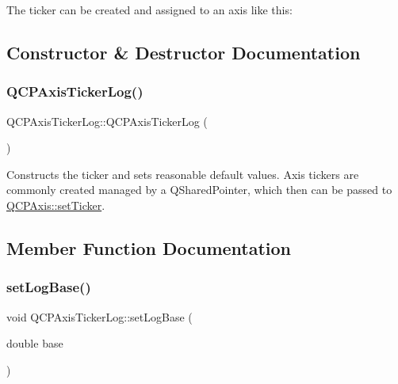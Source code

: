 The ticker can be created and assigned to an axis like this\+: 
\begin{DoxyCodeInclude}
\end{DoxyCodeInclude}


\subsection{Constructor \& Destructor Documentation}
\mbox{\label{class_q_c_p_axis_ticker_log_af3cb86ea5eef2023c0b96b5260c4cbdf}} 
\subsubsection{\texorpdfstring{Q\+C\+P\+Axis\+Ticker\+Log()}{QCPAxisTickerLog()}}
{\footnotesize\ttfamily Q\+C\+P\+Axis\+Ticker\+Log\+::\+Q\+C\+P\+Axis\+Ticker\+Log (\begin{DoxyParamCaption}{ }\end{DoxyParamCaption})}

Constructs the ticker and sets reasonable default values. Axis tickers are commonly created managed by a Q\+Shared\+Pointer, which then can be passed to \hyperlink{class_q_c_p_axis_a4ee03fcd2c74d05cd1a419b9af5cfbdc}{Q\+C\+P\+Axis\+::set\+Ticker}. 

\subsection{Member Function Documentation}
\mbox{\label{class_q_c_p_axis_ticker_log_ac6e3b4e03baea3816f898869ab9751ef}} 
\subsubsection{\texorpdfstring{set\+Log\+Base()}{setLogBase()}}
{\footnotesize\ttfamily void Q\+C\+P\+Axis\+Ticker\+Log\+::set\+Log\+Base (\begin{DoxyParamCaption}\item[{double}]{base }\end{DoxyParamCaption})}

